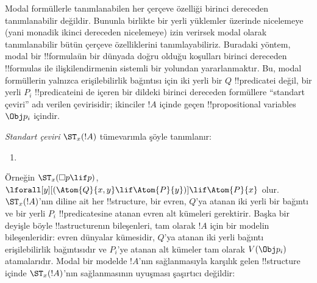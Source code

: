 \documentclass[../../../include/open-logic-section]{subfiles}
\begin{document}


Modal formüllerle tanımlanabilen her çerçeve özelliği birinci dereceden
tanımlanabilir değildir. Bununla birlikte bir yerli yüklemler üzerinde
nicelemeye (yani monadik ikinci dereceden nicelemeye) izin verirsek modal
olarak tanımlanabilir bütün çerçeve özelliklerini tanımlayabiliriz. Buradaki
yöntem, modal bir !!{formula}{}ün bir dünyada doğru olduğu koşulları birinci
dereceden !!{formula}s ile ilişkilendirmenin sistemli bir yolundan
yararlanmaktır. Bu, modal formüllerin yalnızca erişilebilirlik bağıntısı için
iki yerli bir $Q$ !!{predicate}{}i değil, bir yerli $P_i$ !!{predicate}{}ini
de içeren bir dildeki birinci dereceden formüllere ``standart çeviri'' adı verilen çevirisidir;
ikinciler $!A$ içinde geçen !!{propositional variable}s $\Obj p_i$ içindir.

\begin{defn}
  \emph{Standart çeviri} $\ST_x(!A)$ tümevarımla şöyle tanımlanır:
  \begin{enumerate}
  \item {}
  \end{enumerate}
\end{defn}

Örneğin $\ST_x(\Box p\lif p)$, $\lforall[y][(\Atom{Q}{x,y}
  \lif \Atom{P}{y})]\lif\Atom{P}{x}$ olur. $\ST_x(!A)$'nın diline ait
her !!{structure}, bir evren, $Q$'ya atanan iki yerli bir bağıntı ve bir
yerli $P_i$ !!{predicate}s{}ine atanan evren alt kümeleri gerektirir. Başka
bir deyişle böyle !!a{structure}{}nın bileşenleri, tam olarak $!A$ için bir
modelin bileşenleridir: evren dünyalar kümesidir, $Q$'ya atanan iki yerli
bağıntı erişilebilirlik bağıntısıdır ve $P_i$'ye atanan alt kümeler tam
olarak $V(\Obj p_i)$ atamalarıdır. Modal bir modelde $!A$'nın sağlanmasıyla
karşılık gelen !!{structure} içinde $\ST_x(!A)$'nın sağlanmasının uyuşması
şaşırtıcı değildir:
\end{document}
